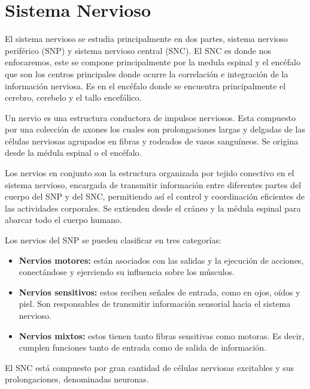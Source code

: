 \section{Sistema Nervioso}

El sistema nervioso se estudia principalmente en dos partes, sistema nervioso periférico (SNP) y sistema nervioso central (SNC). El SNC es donde nos enfocaremos, este se compone principalmente por la medula espinal y el encéfalo que son los centros principales donde ocurre la correlación e integración de la información nerviosa. Es en el encéfalo donde se encuentra principalmente el cerebro, cerebelo y el tallo encefálico.\parencite{sistNerv}   

Un nervio es una estructura conductora de impulsos nerviosos.
Esta compuesto por una colección de axones los cuales son prolongaciones largas y delgadas de las células nerviosas agrupados en fibras y rodeados de vasos sanguíneos.
 Se origina desde la médula espinal o el encéfalo. %

Los nervios en conjunto son la estructura organizada por tejido conectivo en el sistema nervioso, encargada de transmitir información entre diferentes partes del cuerpo del SNP y del SNC, permitiendo así el control y coordinación eficientes de las actividades corporales. Se extienden desde el cráneo y la médula espinal para abarcar todo el cuerpo humano. \parencite{princNS5}

Los nervios del SNP se pueden clasificar en tres categorías:

\begin{itemize}
\item \textbf{Nervios motores:} están asociados con las salidas y la ejecución de acciones, conectándose y ejerciendo su influencia sobre los músculos.
\item \textbf{Nervios sensitivos:} estos reciben señales de entrada, como en ojos, oídos y piel. Son responsables de transmitir información sensorial hacia el sistema nervioso.
\item \textbf{Nervios mixtos:} estos tienen tanto fibras sensitivas como motoras. Es decir, cumplen funciones tanto de entrada como de salida de información.
\end{itemize}

El SNC está compuesto por gran cantidad de células nerviosas excitables y sus prolongaciones, denominadas neuronas. \parencite{sistNerv}   %


